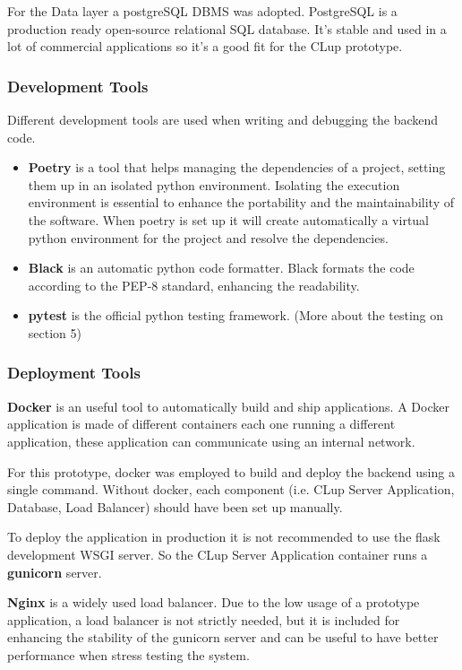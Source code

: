 For the Data layer a postgreSQL DBMS was adopted. PostgreSQL is a production ready open-source relational SQL database. It's stable and used in a lot of commercial applications so it's a good fit for the CLup prototype.

\subsubsection{Development Tools}
Different development tools are used when writing and debugging the backend code.
\begin{itemize}
    \item \textbf{Poetry} is a tool that helps managing the dependencies of a project, setting them up in an isolated python environment. Isolating the execution environment is essential to enhance the portability and the maintainability of the software. When poetry is set up it will create automatically a virtual python environment for the project and resolve the dependencies.
    \item \textbf{Black} is an automatic python code formatter. Black formats the code according to the PEP-8 standard, enhancing the readability.
    \item \textbf{pytest} is the official python testing framework. (More about the testing on section 5)
\end{itemize}

\subsubsection{Deployment Tools}
\textbf{Docker} is an useful tool to automatically build and ship applications. A Docker application is made of different containers each one running a different application, these application can communicate using an internal network.

For this prototype, docker was employed to build and deploy the backend using a single command.
Without docker, each component (i.e. CLup Server Application, Database, Load Balancer) should have been set up manually.

\medskip

To deploy the application in production it is not recommended to use the flask development WSGI server. So the CLup Server Application container runs a \textbf{gunicorn} server.

\medskip

\textbf{Nginx} is a widely used load balancer. Due to the low usage of a prototype application, a load balancer is not strictly needed, but it is included for enhancing the stability of the gunicorn server and can be useful to have better performance when stress testing the system.

